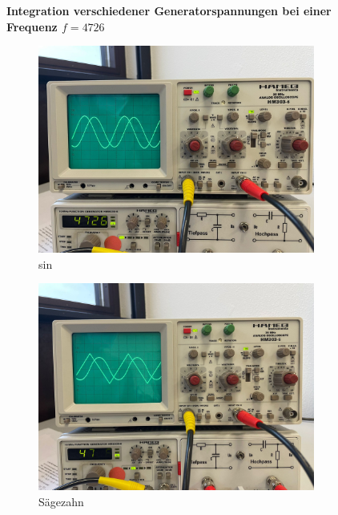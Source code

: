 \begin{figure}
  \centering
  \textbf{Integration verschiedener Generatorspannungen bei einer Frequenz $f = 4726$}\par\medskip
  \begin{subfigure}{0.48\textwidth}
    \centering
    \includegraphics[scale=0.1]{content/sinInt.png}
    \caption{sin}
  \end{subfigure}
  \hfill
  \begin{subfigure}{0.48\textwidth}
    \centering
    \includegraphics[scale=0.1]{content/saegInt.png}
    \caption{Sägezahn}
  \end{subfigure}
  \caption{}
\end{figure}

